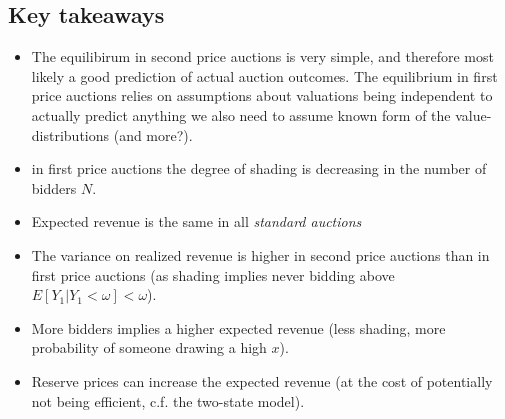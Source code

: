 \subsection{Key takeaways}
\begin{itemize}
\item The equilibirum in second price auctions is very simple, and therefore most likely a good prediction of actual auction outcomes. The equilibrium in first price auctions relies on assumptions about valuations being independent to actually predict anything we also need to assume known form of the value-distributions (and more?).
\item in first price auctions the degree of shading is decreasing in the number of bidders $N$.
\item  Expected revenue is the same in all \textit{standard auctions}
\item The variance on realized revenue is higher in second price auctions than in first price auctions (as shading implies never bidding above $E[Y_1 | Y_1 < \omega] < \omega$).
\item More bidders implies a higher expected revenue (less shading, more probability of someone drawing a high $x$).
\item Reserve prices can increase the expected revenue (at the cost of potentially not being efficient, c.f. the two-state model). 
\end{itemize}
